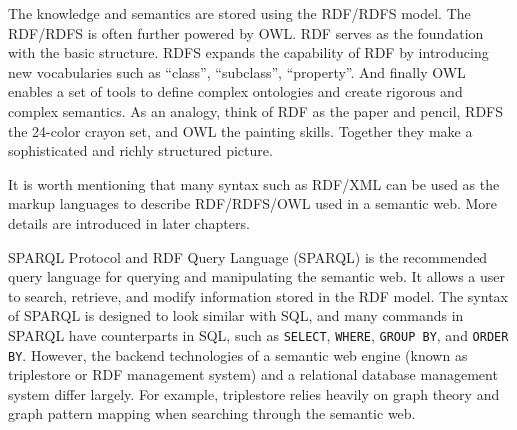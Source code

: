 The knowledge and semantics are stored using the RDF/RDFS model. The RDF/RDFS is often further powered by OWL. RDF serves as the foundation with the basic structure. RDFS expands the capability of RDF by introducing new vocabularies such as ``class'', ``subclass'', ``property''. And finally OWL enables a set of tools to define complex ontologies and create rigorous and complex semantics. As an analogy, think of RDF as the paper and pencil, RDFS the 24-color crayon set, and OWL the painting skills. Together they make a sophisticated and richly structured picture.

It is worth mentioning that many syntax such as RDF/XML can be used as the markup languages to describe RDF/RDFS/OWL used in a semantic web. More details are introduced in later chapters.

SPARQL Protocol and RDF Query Language (SPARQL) is the recommended query language for querying and manipulating the semantic web. It allows a user to search, retrieve, and modify information stored in the RDF model. The syntax of SPARQL is designed to look similar with SQL, and many commands in SPARQL have counterparts in SQL, such as \verb|SELECT|, \verb|WHERE|, \verb|GROUP BY|, and \verb|ORDER BY|. However, the backend technologies of a semantic web engine (known as triplestore or RDF management system) and a relational database management system differ largely. For example, triplestore relies heavily on graph theory and graph pattern mapping when searching through the semantic web.

